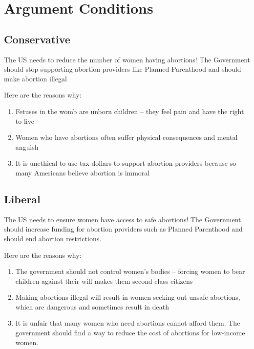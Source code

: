 \documentclass[12pt, titlepage]{article}
\begin{document}
\section*{Argument Conditions}

\subsection*{Conservative}

The US needs to reduce the number of women having abortions! The Government should stop supporting abortion providers like Planned Parenthood and should make abortion illegal

Here are the reasons why:
\begin{enumerate}
	\item Fetuses in the womb are unborn children – they feel pain and have the right to live
	\item	Women who have abortions often suffer physical consequences and mental anguish
	\item	It is unethical to use tax dollars to support abortion providers because so many Americans believe abortion is immoral
\end{enumerate}


\subsection*{Liberal}

The US needs to ensure women have access to safe abortions! The Government should increase funding for abortion providers such as Planned Parenthood and should end abortion restrictions.

Here are the reasons why:
\begin{enumerate}
	\item  The government should not control women’s bodies – forcing women to bear children against their will makes them second-class citizens
	\item Making abortions illegal will result in women seeking out unsafe abortions, which are dangerous and sometimes result in death
	\item It is unfair that many women who need abortions cannot afford them. The government should find a way to reduce the cost of abortions for low-income women.
\end{enumerate}
\end{document}
